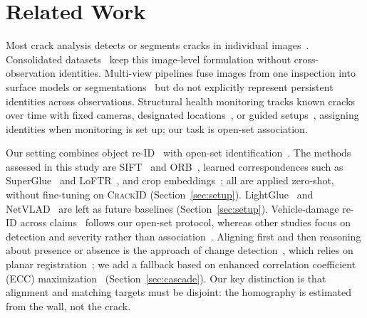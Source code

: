 \section{Related Work}
\label{sec:related}

Most crack analysis detects or segments cracks in individual images~\cite{zou2012cracktree,liu2019deepcrack,eisenbach2017gaps}.
Consolidated datasets~\cite{kulkarni2022crackseg9k,benz2024omnicrack30k} keep this image-level formulation without cross-observation identities.
Multi-view pipelines fuse images from one inspection into surface models or segmentations~\cite{benz2025crackstructures} but do not explicitly represent persistent identities across observations.
Structural health monitoring tracks known cracks over time with fixed cameras, designated locations~\cite{parente2022monitoring,harb2025multitemporal,sun2025perspective}, or guided setups~\cite{nec2019guide}, assigning identities when monitoring is set up; our task is open-set association.

Our setting combines object re-ID~\cite{qian2024reidtrends} with open-set identification~\cite{liao2014openset}.
The methods assessed in this study are SIFT~\cite{lowe2004sift} and ORB~\cite{rublee2011orb}, learned correspondences such as SuperGlue~\cite{sarlin2020superglue} and LoFTR~\cite{sun2021loftr}, and crop embeddings~\cite{zhou2019osnet,dosovitskiy2021vit,touvron2021deit,radford2021clip,oquab2024dinov2,jocher2023ultralytics}; all are applied zero-shot, without fine-tuning on \textsc{CrackID} (Section~\ref{sec:setup}).
LightGlue~\cite{lindenberger2023lightglue} and NetVLAD~\cite{arandjelovic2016netvlad} are left as future baselines (Section~\ref{sec:setup}).
Vehicle-damage re-ID across claims~\cite{maiano2023antifraud} follows our open-set protocol, whereas other studies focus on detection and severity rather than association~\cite{hasan2025review,perez2024assessment,mallios2023multiview}.
Aligning first and then reasoning about presence or absence is the approach of change detection~\cite{sakurada2015changedetection,alcantarilla2018street}, which relies on planar registration~\cite{hartley2004mvg,fischler1987ransac,barath2019magsac}; we add a fallback based on enhanced correlation coefficient (ECC) maximization~\cite{evangelidis2008ecc} (Section~\ref{sec:cascade}).
Our key distinction is that alignment and matching targets must be disjoint: the homography is estimated from the wall, not the crack.
